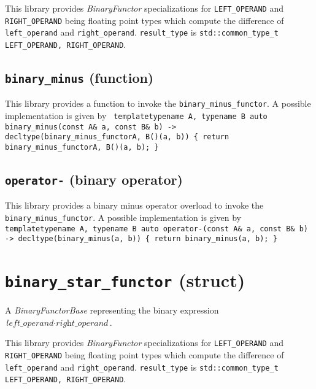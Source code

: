 \documentclass[oneside]{book}
\begin{document}
\noindent{}This library provides \textit{BinaryFunctor}         specializations for
\texttt{LEFT\_OPERAND} and   \texttt{RIGHT\_OPERAND} being     floating point types
which compute the difference of \texttt{left\_operand} and \texttt{right\_operand}.
\texttt{result\_type} is \texttt{std::common\_type\_t  \textlangle   LEFT\_OPERAND,
RIGHT\_OPERAND\textrangle}.

\subsection{\texttt{binary\_minus} (function)}
This library provides a function to invoke the \texttt{binary\_minus\_functor}.
A possible implementation is given by\newline
\texttt{
template\textlangle typename A, typename B\textrangle\newline
auto binary\_minus(const A\& a, const B\& b) -> decltype(binary\_minus\_functor\textlangle A, B\textrangle()(a, b))\newline
\{ return binary\_minus\_functor\textlangle A, B\textrangle()(a, b); \}
}

\subsection{\texttt{operator-} (binary operator)}
This library provides a binary minus operator overload to invoke the \texttt{binary\_minus\_functor}.
A possible implementation is given by\newline
\texttt{
template\textlangle typename A, typename B\textrangle\newline
auto operator-(const A\& a, const B\& b) -> decltype(binary\_minus(a, b))\newline
\{ return binary\_minus(a, b); \}
}

\section{\texttt{binary\_star\_functor} (struct)}
A \textit{BinaryFunctorBase} representing the binary expression $\textit{left\_operand} \cdot \textit{right\_operand}$.\newline

\noindent{}This library provides \textit{BinaryFunctor}         specializations for
\texttt{LEFT\_OPERAND} and   \texttt{RIGHT\_OPERAND} being     floating point types
which compute the difference of \texttt{left\_operand} and \texttt{right\_operand}.
\texttt{result\_type} is \texttt{std::common\_type\_t  \textlangle   LEFT\_OPERAND,
RIGHT\_OPERAND\textrangle}.
\end{document}

